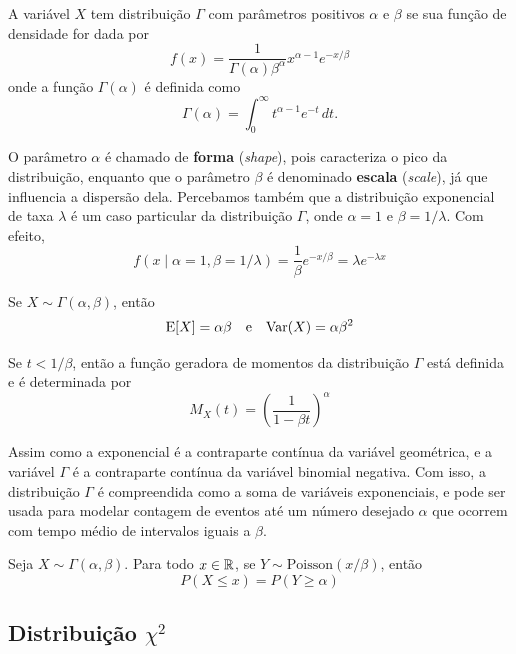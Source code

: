 \begin{def:gama}
A variável $X$ tem distribuição $\Gamma$ com parâmetros positivos $\alpha$ e $\beta$ se
sua função de densidade for dada por
\[
    f(x) = \frac{1}{\Gamma(\alpha) \beta^\alpha} x^{\alpha - 1} e^{-x / \beta}
\]
onde a função $\Gamma(\alpha)$ é definida como
\[
    \Gamma(\alpha) = \int_0^\infty t^{\alpha - 1} e^{-t}\, dt.
\]
\end{def:gama}

O parâmetro $\alpha$ é chamado de \textbf{forma} (\textit{shape}), pois caracteriza o pico
da distribuição, enquanto que o parâmetro $\beta$ é denominado \textbf{escala}
(\textit{scale}), já que influencia a dispersão dela.
Percebamos também que a distribuição exponencial de taxa $\lambda$ é um caso particular da
distribuição $\Gamma$, onde $\alpha = 1$ e $\beta = 1/\lambda$.
Com efeito,
\[
    f(x \mid \alpha = 1, \beta = 1/\lambda) = \frac 1 \beta e^{-x/\beta} = \lambda e^{-\lambda x}
\]

\begin{prop:gama}
Se $X \sim \Gamma(\alpha, \beta)$, então
\[
    \mathrm{E}\!\left[X\right] = \alpha \beta \quad \text{e} \quad \mathrm{Var}\!\left(X\right) = \alpha \beta^2
\]
\end{prop:gama}

\begin{prop:mgf gama}
Se $t < 1/\beta$, então a função geradora de momentos da distribuição $\Gamma$ está
definida e é determinada por
\[
    M_X(t) = \left(\frac{1}{1 - \beta t}\right)^\alpha
\]
\end{prop:mgf gama}

Assim como a exponencial é a contraparte contínua da variável geométrica, e
a variável $\Gamma$ é a contraparte contínua da variável binomial negativa.
Com isso, a distribuição $\Gamma$ é compreendida como a soma de variáveis exponenciais, e
pode ser usada para modelar contagem de eventos até um número desejado $\alpha$ que
ocorrem com tempo médio de intervalos iguais a $\beta$.

\begin{prop:relacao gama e poison}
Seja $X \sim \Gamma(\alpha, \beta)$.
Para todo $x \in \mathbb{R}$, se $Y \sim \mathrm{Poisson}(x/\beta)$, então
\[
    P(X \le x) = P(Y \ge \alpha)
\]
\end{prop:relacao gama e poison}

\subsection{Distribuição $\chi^2$}

